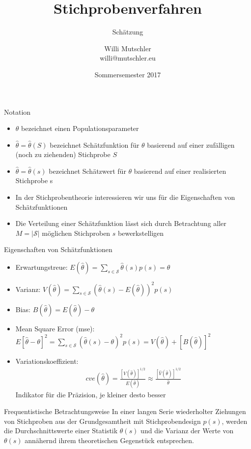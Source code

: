 \documentclass[9pt]{beamer}
\title{Stichprobenverfahren}
\subtitle{Schätzung}
\date[SS2017]{Sommersemester 2017}
\author{Willi Mutschler\\willi@mutschler.eu}
\begin{document}
\maketitle

\begin{frame}{Notation}
	\begin{itemize}
		\item $\theta$ bezeichnet einen Populationsparameter
		\item $\hat{\theta} = \hat{\theta}(S)$ bezeichnet Schätzfunktion für $\theta$ basierend auf einer zufälligen (noch zu ziehenden) Stichprobe $S$
		\item $\hat{\theta} = \hat{\theta}(s)$ bezeichnet Schätzwert für $\theta$ basierend auf einer realisierten Stichprobe s
		\item In der Stichprobentheorie interessieren wir uns für die Eigenschaften von Schätzfunktionen
		\item Die Verteilung einer Schätzfunktion lässt sich durch Betrachtung aller $M=|\mathcal{S}|$ möglichen Stichproben $s$ bewerkstelligen
	\end{itemize}
\end{frame}

\begin{frame}{Eigenschaften von Schätzfunktionen}	
\begin{itemize}
	\item Erwartungstreue: $E(\hat{\theta}) = \sum_{s\in \mathcal{S}}\hat{\theta}(s)p(s) = \theta$
	\item Varianz: $V(\hat{\theta}) = \sum_{s \in \mathcal{S}} \left(\hat{\theta}(s)-E(\hat{\theta})\right)^2p(s)$
	\item Bias: $B(\hat{\theta})=E(\hat{\theta})-\theta$
	\item Mean Square Error (mse): $E\left[\hat{\theta}-\theta\right]^2 = \sum_{s \in \mathcal{S}} \left(\hat{\theta}(s)-\theta\right)^2 p(s)= V(\hat{\theta}) + [B(\hat{\theta})]^2$
	\item Variationskoeffizient:
	\begin{align*}
	cve(\hat{\theta}) = \frac{[V(\hat{\theta})]^{1/2}}{E(\hat{\theta})} \approx \frac{[\hat{V}(\hat{\theta})]^{1/2}}{\hat{\theta}}
	\end{align*}
	Indikator für die Präzision, je kleiner desto besser
\end{itemize}
\begin{block}{Frequentistische Betrachtungsweise}
	In einer langen Serie wiederholter Ziehungen von Stichproben aus der Grundgesamtheit mit Stichprobendesign $p(s)$, werden die Durchschnittswerte einer Statistik $\theta(s)$ und die Varianz der Werte von $\theta(s)$ annähernd ihrem theoretischen Gegenstück entsprechen.
\end{block}
\end{frame}
\end{document}
